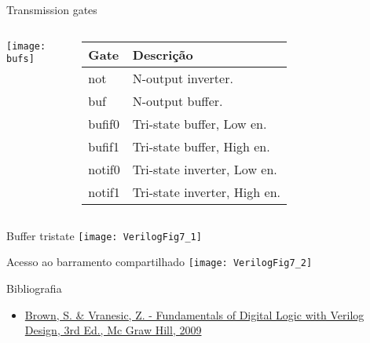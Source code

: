 

\subtitle{Estruturas de Barramentos} %



\begin{frame}
	\titlepage
\end{frame} 

\begin{frame}{Transmission gates} \centering
    \begin{columns}
            \texttt{[image: bufs]}
            \footnotesize
            \begin{tabular}{ll}
                \hline
                \textbf{Gate} & \textbf{Descrição}\\
                \hline
                \hline
                not & N-output inverter.\\
                buf & N-output buffer.\\
                bufif0 & Tri-state buffer, Low en.\\
                bufif1 & Tri-state buffer, High en.\\
                notif0 & Tri-state inverter, Low en.\\
                notif1 & Tri-state inverter, High en.\\
                \hline
            \end{tabular}
    \end{columns}
\end{frame}

\begin{frame}{Buffer tristate} \centering
    \texttt{[image: VerilogFig7\_1]}
\end{frame}

\begin{frame}{Acesso ao barramento compartilhado} \centering
    \texttt{[image: VerilogFig7\_2]}
\end{frame}

\begin{frame}{Bibliografia} 
	\begin{itemize}
		\item \href{https://www.google.com.br/search?q=filetype\%3Apdf+Fundamentals+of+Digital+Logic+with+Verilog+Design+&oq=filetype\%3Apdf}{Brown, S. \& Vranesic, Z. - Fundamentals of Digital Logic with Verilog Design, 3rd Ed., Mc Graw Hill, 2009}
	\end{itemize}
\end{frame}

\begin{frame}
	\titlepage
\end{frame} 

